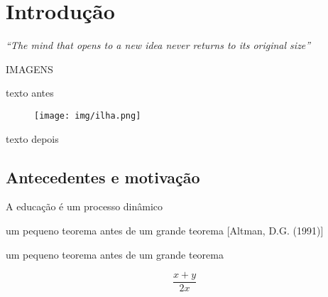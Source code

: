 \documentclass[Tese.tex]{subfiles}
\begin{document}
\chapter{Introdução}

\rightline
{\textit{``The mind that opens to a new idea never returns to its original size''}}


IMAGENS

texto antes


\begin{figure}[H]
	\texttt{[image: img/ilha.png]}
\end{figure}	


texto depois





\section{Antecedentes e motivação}

A educação é um processo dinâmico 



\begin{theorem}\label{teo: importante}
	um pequeno teorema antes de um grande teorema [Altman, D.G. (1991)]
\end{theorem}


\begin{theorem}\label{teo: importante}
	um pequeno teorema antes de um grande teorema \cite{altman91}
\end{theorem}


\begin{equation}\label{eq: principal}
	\frac{x+y}{2x}
\end{equation}
\end{document}
